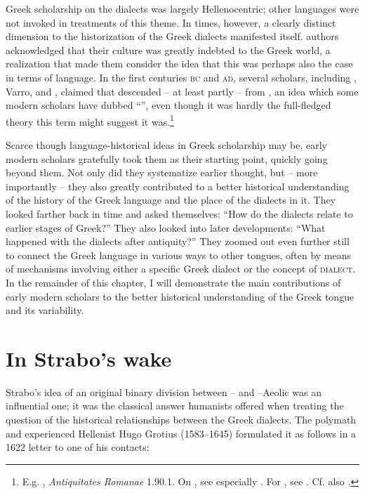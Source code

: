 Greek scholarship on the dialects was largely Hellenocentric; other languages were not invoked in treatments of this theme. In  times, however, a clearly distinct dimension to the historization of the Greek dialects manifested itself.  authors acknowledged that their culture was greatly indebted to the Greek world, a realization that made them consider the idea that this was perhaps also the case in terms of language. In the first centuries \textsc{bc} and \textsc{ad}, several scholars, including , Varro, and , claimed that  descended – at least partly – from , an idea which some modern scholars have dubbed “”, even though it was hardly the full-fledged theory this term might suggest it was.\footnote{E.g. , \textit{Antiquitates Romanae} 1.90.1. On , see especially \citet[]{Stevens2006}. For , see \citet[149]{Fogen2000}. Cf. also \citet[117--119]{Schopsdau1992}.}

Scarce though language-historical ideas in Greek scholarship may be, early modern scholars gratefully took them as their starting point, quickly going beyond them. Not only did they systematize earlier thought, but – more importantly – they also greatly contributed to a better historical understanding of the history of the Greek language and the place of the dialects in it. They looked farther back in time and asked themselves: “How do the dialects relate to earlier stages of Greek?” They also looked into later developments: “What happened with the dialects after antiquity?” They zoomed out even further still to connect the Greek language in various ways to other tongues, often by means of mechanisms involving either a specific Greek dialect or the concept of \textsc{dialect}. In the remainder of this chapter, I will demonstrate the main contributions of early modern scholars to the better historical understanding of the Greek tongue and its variability.

\section{In Strabo’s wake}\label{sec:5.2}

Strabo’s idea of an original binary division between – and –Ae\-ol\-ic was an influential one; it was the classical answer humanists offered when treating the question of the historical relationships between the Greek dialects. The  polymath and experienced Hellenist Hugo Grotius (1583–1645) formulated it as follows in a 1622 letter to one of his  contacts:

